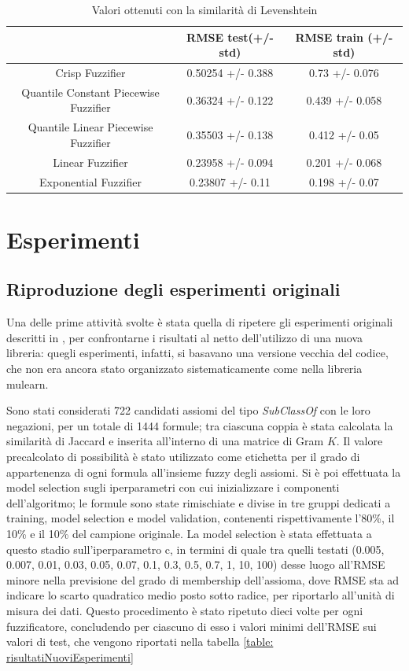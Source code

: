\documentclass[12pt,a4paper]{report}
\begin{document}
\begin{table}[h!]
\small
\centering 	
	\begin{tabular}{|c|c|c|} 
	 \hline
	  & RMSE test(+/- std) & RMSE train (+/- std)\\ [0.5ex] 
	 \hline
	 Crisp Fuzzifier & 0.50254 +/- 0.388 & 0.73 +/- 0.076 \\ 
	 \hline
	 Quantile Constant Piecewise Fuzzifier & 0.36324 +/- 0.122 & 0.439 +/- 0.058\\
	 \hline
	 Quantile Linear Piecewise Fuzzifier & 0.35503 +/- 0.138	 & 0.412 +/- 0.05\\
	 \hline
	 Linear Fuzzifier & 0.23958 +/- 0.094 & 0.201 +/- 0.068\\
	 \hline
	 Exponential Fuzzifier & 0.23807 +/- 0.11 & 0.198 +/- 0.07\\ [1ex] 
	 \hline
	\end{tabular}
	\caption{Valori ottenuti con la similarità di Levenshtein}
	\label{table:risultatiLevenshtein}
\end{table}


\chapter{Esperimenti}\label{capitoloEsperimenti}

\section{Riproduzione degli esperimenti originali}
Una delle prime attività svolte è stata quella di ripetere gli esperimenti originali descritti in \cite{sacpaper}, per confrontarne i risultati al netto dell'utilizzo di una nuova libreria: quegli esperimenti, infatti, si basavano una versione vecchia del codice, che non era ancora stato organizzato sistematicamente come nella libreria mulearn.

Sono stati considerati 722 candidati assiomi del tipo \emph{SubClassOf} con le loro negazioni, per un totale di 1444 formule;  tra ciascuna coppia è stata calcolata la similarità di Jaccard e inserita all'interno di una matrice di Gram $K$.
Il valore precalcolato di possibilità è stato utilizzato come etichetta per il grado di appartenenza di ogni formula all'insieme fuzzy degli assiomi.
Si è poi effettuata la model selection sugli iperparametri con cui inizializzare i componenti dell'algoritmo; le formule sono state rimischiate e divise in tre gruppi dedicati a training, model selection e model validation, contenenti rispettivamente l'80\%, il 10\% e il 10\% del campione originale.
La model selection è stata effettuata a questo stadio sull'iperparametro c, in termini di quale tra quelli testati (0.005, 0.007, 0.01, 0.03, 0.05, 0.07, 0.1, 0.3, 0.5, 0.7, 1, 10, 100) desse luogo all'RMSE minore nella previsione del grado di membership dell'assioma, dove RMSE sta ad indicare lo scarto quadratico medio posto sotto radice, per riportarlo all'unità di misura dei dati.
Questo procedimento è stato ripetuto dieci volte per ogni fuzzificatore, concludendo per ciascuno di esso i valori minimi dell'RMSE sui valori di test, che vengono riportati nella tabella \ref{table: risultatiNuoviEsperimenti}
\end{document}
